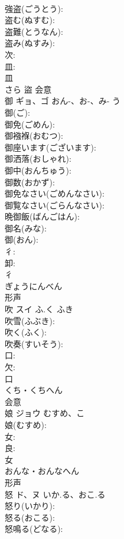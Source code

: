 \documentclass[8pt]{extreport}
\begin{document}
\begin{CJK}{UTF8}{min}
\\	強盗(ごうとう): 
\\	盗む(ぬすむ): 
\\	盗難(とうなん): 
\\	盗み(ぬすみ): 
\\	次: 
\\	皿: 
\\	皿	
\\	さら	盜	会意 
\\	御	ギョ、ゴ	おん-、お-、み-	う	
\\	御(ご): 
\\	御免(ごめん): 
\\	御襁褓(おむつ): 
\\	御座います(ございます): 
\\	御洒落(おしゃれ): 
\\	御中(おんちゅう): 
\\	御数(おかず): 
\\	御免なさい(ごめんなさい): 
\\	御覧なさい(ごらんなさい): 
\\	晩御飯(ばんごはん): 
\\	御名(みな): 
\\	御(おん): 
\\	彳: 
\\	卸: 
\\	彳	
\\	ぎょうにんべん	
\\	形声 
\\	吹	スイ	ふ.く	ふき	
\\	吹雪(ふぶき): 
\\	吹く(ふく): 
\\	吹奏(すいそう): 
\\	口: 
\\	欠: 
\\	口	
\\	くち・くちへん	
\\	会意 
\\	娘	ジョウ	むすめ、こ		
\\	娘(むすめ): 
\\	女: 
\\	良: 
\\	女	
\\	おんな・おんなへん	
\\	形声 
\\	怒	ド、ヌ	いか.る、おこ.る		
\\	怒り(いかり): 
\\	怒る(おこる): 
\\	怒鳴る(どなる): 

\end{CJK}
\end{document}
